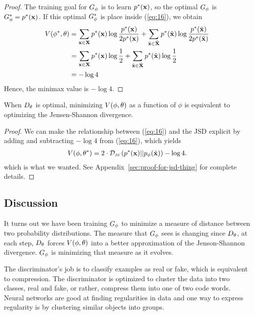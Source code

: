 \begin{proof}
  The training goal for $G_\phi$ is to learn $p^*(\mathbf{x})$, so the optimal $G_\phi$ is $G_\phi^* =
  p^*(\mathbf{x})$. If this optimal $G_\phi^*$ is place inside (\ref{eq:16}), we obtain
  \begin{align}
    \label{eq:side-note}
    V(\phi^*, \theta) & = \sum_{\mathbf{x} \in \mathbf{X}}p^*(\mathbf{x}) \log{ p^*(\mathbf{x})\over 2 p^*(\mathbf{x})} + \sum_{\tilde{\mathbf{x}} \in \tilde{\mathbf{X}}}p^*(\tilde{\mathbf{x}}) \log{ p^*(\tilde{\mathbf{x}}) \over 2 p^*(\tilde{\mathbf{x}})} \\
                      & = \sum_{\mathbf{x} \in \mathbf{X}} p^*(\mathbf{x}) \log {1 \over 2} +
                        \sum_{\tilde{\mathbf{x}} \in \tilde{\mathbf{X}}} p^*(\tilde{\mathbf{x}}) \log {1 \over 2} \\
                      & = -\log{4}
  \end{align}
  Hence, the minimax value is $ - \log{4}$.
\end{proof}

\begin{theorem}
  When $D_\theta$ is optimal, minimizing $V(\phi, \theta)$ as a function of $\phi$ is equivalent to
  optimizing the Jensen-Shannon divergence.
\end{theorem}

\begin{proof}
  We can make the relationship between (\ref{eq:16}) and the JSD explicit by
  adding and subtracting $-\log{4}$ from (\ref{eq:16}), which yields
  \begin{align}
    \label{eq:desired}
    V(\phi, \theta^*) = 2 \cdot \mathcal{D}_{\text{\tiny JS}}\left(p^*(\mathbf{x})\middle|\middle|p_{\phi}(\tilde{\mathbf{x}})\right) - \log{4}.
  \end{align}
  which is what we wanted. See Appendix~\ref{sec:proof-for-jsd-thing} for
  complete details.
\end{proof}

\subsection{Discussion}

It turns out we have been training $G_\phi$ to minimize a measure of
distance between two probability distributions. The measure that $G_\phi$
sees is changing since $D_\theta$, at each step, $D_\theta$ forces $V(\phi, \theta)$ into a
better approximation of the Jenson-Shannon divergence.  $G_\phi$ is
minimizing that measure as it evolves.

The discriminator's job is to classify examples as real or fake, which
is equivalent to compression. The discriminator is optimized to
cluster the data into two classes, real and fake, or rather, compress
them into one of two code words. Neural networks are good at finding
regularities in data and one way to express regularity is by
clustering similar objects into groups.

